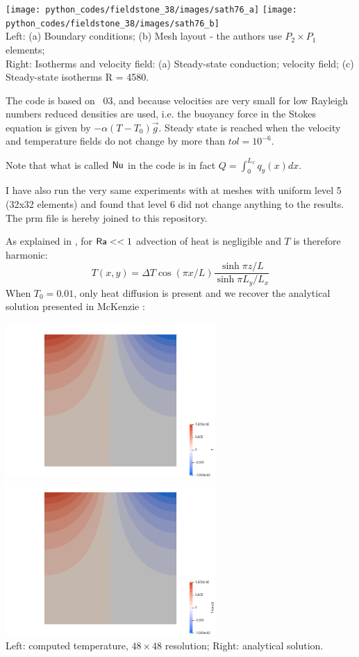 \begin{center}
\texttt{[image: python\_codes/fieldstone\_38/images/sath76\_a]}
\texttt{[image: python\_codes/fieldstone\_38/images/sath76\_b]}\\
{\captionfont Left: (a) Boundary conditions; (b) Mesh layout - the authors
use $P_2\times P_1$ elements;\\
Right: Isotherms and velocity field: (a) Steady-state conduction;
velocity field; (c) Steady-state isotherms R = 4580.}
\end{center}

The code is based on \stone~03, and because velocities are very small for low Rayleigh numbers
reduced densities are used, i.e. the buoyancy force in the Stokes equation is given by $-\alpha(T-T_0)\vec{g}$.
Steady state is reached when the velocity and temperature fields do not change by more than $tol=10^{-6}$.

Note that what is called ${\mathsf{Nu}}$ in the code is in fact $Q=\int_0^{L_x} q_y(x) dx$.

I have also run the very same experiments with \aspect{} at meshes with uniform level 5 (32x32 
elements) and found that level 6 did not change anything to the results. 
The prm file is hereby joined to this repository.

As explained in \textcite{mcrw74}, for ${\mathsf{Ra}} <<1$ advection of heat is negligible and $T$ is 
therefore harmonic:
\[
T(x,y) = \Delta T \cos (\pi x/L) \frac{\sinh \pi z/L}{\sinh \pi L_y/L_x}
\]
When $T_0=0.01$, only heat diffusion is present and we recover the analytical solution presented 
in McKenzie \etal:

\begin{center}
\includegraphics[width=8cm]{python_codes/fieldstone_38/RESULTS/T0_0p001_32x32/T}
\includegraphics[width=8cm]{python_codes/fieldstone_38/RESULTS/T0_0p001_32x32/T_anal}\\
{\captionfont Left: computed temperature, $48\times48$ resolution; Right: analytical solution.}
\end{center}

